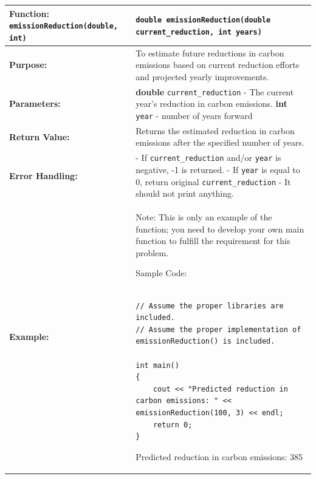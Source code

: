 \renewcommand{\arraystretch}{1.5} 
\begin{longtable}{|p{1.7in}|p{4.3in}|}
\hline
\textbf{Function:}  \texttt{emissionReduction(double, int)}& \texttt{double emissionReduction(double current_reduction, int years)}\\ \hline

\textbf{Purpose:} & To estimate future reductions in carbon emissions based on current reduction efforts and projected yearly improvements.\\ \hline

\textbf{Parameters:} & 
\textbf{double} \texttt{current\_reduction} - The current year's reduction in carbon emissions. \newline
\textbf{int} \texttt{year} - number of years forward\\ \hline

\textbf{Return Value:} & 
Returns the estimated reduction in carbon emissions after the specified number of years.\\ \hline

\textbf{Error Handling:} & 
- If \texttt{current\_reduction} and/or \texttt{year} is negative, -1 is returned. \newline
- If \texttt{year} is equal to 0, return original \texttt{current\_reduction} \newline
- It should not print anything.\\ \hline

\textbf{Example:}& 

Note: This is only an example of the function; you need to develop your own main function to fulfill the requirement for this problem.

Sample Code:

\begin{example}
        \begin{verbatim}

// Assume the proper libraries are included.
// Assume the proper implementation of emissionReduction() is included.

int main()
{
    cout << "Predicted reduction in carbon emissions: " << emissionReduction(100, 3) << endl;
    return 0;
}
        \end{verbatim}
        \end{example}

        \begin{sample}
Predicted reduction in carbon emissions: 385
        \end{sample}\\\hline
\end{longtable}
 
